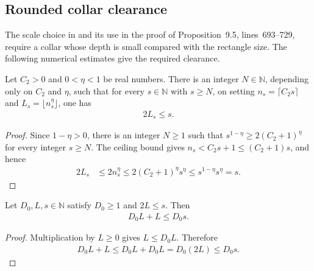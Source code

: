 \subsection{Rounded collar clearance}

The scale choice in \cite[Section~9, lines~32--41]{OpenAI2026AreaLaw} and
its use in the proof of Proposition~9.5, lines~693--729, require a collar
whose depth is small compared with the rectangle size. The following
numerical estimates give the required clearance.

\begin{lemma}
    \label{thm:area_law_rounded_collar_half}
    \leanok
    Let $C_2>0$ and $0<\eta<1$ be real numbers. There is an integer
    $N\in\mathbb N$, depending only on $C_2$ and $\eta$, such that for
    every $s\in\mathbb N$ with $s\ge N$, on setting
    $n_s=\lceil C_2s\rceil$ and $L_s=\lfloor n_s^\eta\rfloor$, one has
    \begin{align}
        2L_s\le s.
    \end{align}
\end{lemma}
\begin{proof}\leanok
    Since $1-\eta>0$, there is an integer $N\ge1$ such that
    $s^{1-\eta}\ge2(C_2+1)^\eta$ for every integer $s\ge N$.
    The ceiling bound gives $n_s<C_2s+1\le(C_2+1)s$, and hence
    \begin{align}
        2L_s
         & \le2n_s^\eta
        \le2(C_2+1)^\eta s^\eta
        \le s^{1-\eta}s^\eta=s.
    \end{align}
\end{proof}

\begin{lemma}
    \label{thm:area_law_collar_scalar_clearance}
    \leanok
    Let $D_0,L,s\in\mathbb N$ satisfy $D_0\ge1$ and $2L\le s$. Then
    \begin{align}
        D_0L+L\le D_0s.
    \end{align}
\end{lemma}
\begin{proof}\leanok
    Multiplication by $L\ge0$ gives $L\le D_0L$. Therefore
    \begin{align}
        D_0L+L\le D_0L+D_0L=D_0(2L)\le D_0s.
    \end{align}
\end{proof}

